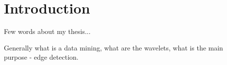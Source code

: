 \chapter*{Introduction}
Few words about my thesis...

Generally what is a data mining, what are the wavelets, what is the main purpose - edge detection.